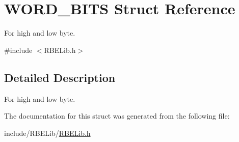 \hypertarget{struct_w_o_r_d___b_i_t_s}{\section{W\+O\+R\+D\+\_\+\+B\+I\+T\+S Struct Reference}
\label{struct_w_o_r_d___b_i_t_s}
}


For high and low byte.  




{\ttfamily \#include $<$R\+B\+E\+Lib.\+h$>$}



\subsection{Detailed Description}
For high and low byte. 

The documentation for this struct was generated from the following file\+:\begin{DoxyCompactItemize}
\item 
include/\+R\+B\+E\+Lib/\hyperlink{_r_b_e_lib_8h}{R\+B\+E\+Lib.\+h}\end{DoxyCompactItemize}
